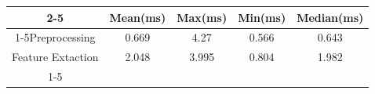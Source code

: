 \documentclass{standalone}
\begin{document}
 
 \begin{tabular}{|c |c |c |c |c |}
\cline{2-5}\cline{2-5} \multicolumn{1}{c |}{ } & Mean(ms) & Max(ms) & Min(ms) & Median(ms)\\ 
\cline{1-5}Preprocessing & 0.669 & 4.27 & 0.566 & 0.643\\ 
 \hhline{|=|=|=|=|=|}Feature Extaction & 2.048 & 3.995 & 0.804 & 1.982\\ 
 \cline{1-5}\hline \end{tabular}
 
\end{document}
